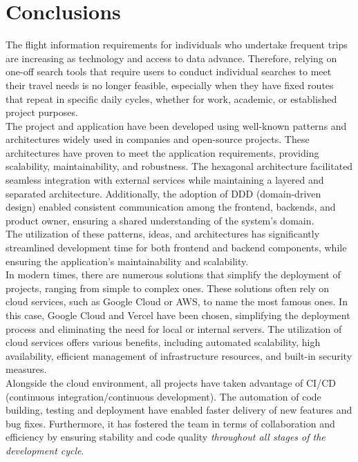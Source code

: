\documentclass[../memory.tex]{subfiles}
\begin{document}
\chapter{Conclusions}
The flight information requirements for individuals who undertake frequent trips
are increasing as technology and access to data advance. Therefore, relying on
one-off search tools that require users to conduct individual searches to meet
their travel needs is no longer feasible, especially when they have fixed routes
that repeat in specific daily cycles, whether for work, academic, or established
project purposes.
\\[8pt]
The project and application have been developed using well-known patterns and
architectures widely used in companies and open-source projects. These
architectures have proven to meet the application requirements, providing
scalability, maintainability, and robustness. The hexagonal architecture
facilitated seamless integration with external services while maintaining a
layered and separated architecture. Additionally, the adoption of DDD
(domain-driven design) enabled consistent communication among the frontend,
backends, and product owner, ensuring a shared understanding of the system's
domain.
\\
The utilization of these patterns, ideas, and architectures has significantly
streamlined development time for both frontend and backend components, while
ensuring the application's maintainability and scalability.
\\[8pt]
In modern times, there are numerous solutions that simplify the deployment of
projects, ranging from simple to complex ones. These solutions often rely on
cloud services, such as Google Cloud or AWS, to name the most famous ones. In
this case, Google Cloud and Vercel have been chosen, simplifying the deployment
process and eliminating the need for local or internal servers. The utilization
of cloud services offers various benefits, including automated scalability, high
availability, efficient management of infrastructure resources, and built-in
security measures.
\\[8pt]
Alongside the cloud environment, all projects have taken advantage of
CI/CD (continuous integration/continuous development). The automation of code
building, testing and deployment have enabled faster delivery of new features
and bug fixes. Furthermore, it has fostered the team in terms of collaboration and
efficiency by ensuring stability and code quality \emph{throughout all stages of
	the development cycle}.
\\[8pt]
\end{document}
